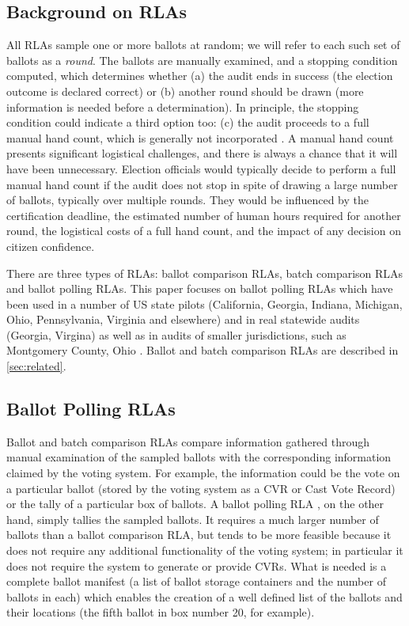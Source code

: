 \subsection{Background on RLAs}
All RLAs sample one or more ballots at random; we will refer to each such set of ballots as a {\em round}. The ballots are manually examined, and a stopping condition computed, which determines whether (a) the audit ends in success (the election outcome is declared correct) or (b) another round should be drawn (more information is needed before a determination). In principle, the stopping condition could indicate a third option too: (c) the audit proceeds to a full manual hand count, which is generally not incorporated \cite{bravo}. A manual hand count presents significant logistical challenges, and there is always a chance that it will have been unnecessary. Election officials would typically decide to perform a full manual hand count if the audit does not stop in spite of drawing a large number of ballots, typically over multiple rounds. They would be influenced by the certification deadline, the estimated number of human hours required for another round, the logistical costs of a full hand count, and the impact of any decision on citizen confidence. 

There are three types of RLAs: ballot comparison RLAs, batch comparison RLAs and ballot polling RLAs. This paper focuses on ballot polling RLAs which have been used in a number of US state pilots (California, Georgia, Indiana, Michigan, Ohio, Pennsylvania, Virginia and elsewhere) and in real statewide audits (Georgia, Virgina) \cite{vv_audits} as well as in audits of smaller jurisdictions, such as Montgomery County, Ohio \cite{usenix_minerva}. Ballot and batch comparison RLAs are described in \ref{sec:related}. 

\subsection{Ballot Polling RLAs}
\label{sec:polling}
Ballot and batch comparison RLAs compare information gathered through manual examination of the sampled ballots with the corresponding information claimed by the voting system. For example, the information could be the vote on a particular ballot (stored by the voting system as a CVR or Cast Vote Record) or the tally of a particular box of ballots. A ballot polling RLA \cite{RLA}, on the other hand, simply tallies the sampled ballots. It requires a much larger number of ballots than a ballot comparison RLA, but tends to be more feasible because it does not require any additional functionality of the voting system; in particular it does not require the system to generate or provide CVRs. What is needed is a complete ballot manifest (a list of ballot storage containers and the number of ballots in each) which enables the creation of a well defined list of the ballots and their locations (the fifth ballot in box number 20, for example).  

